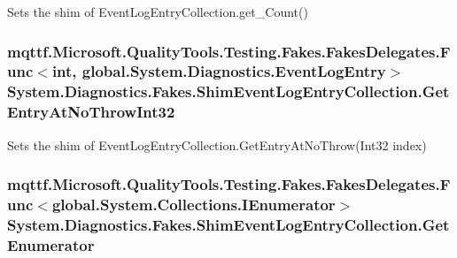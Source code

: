 Sets the shim of Event\-Log\-Entry\-Collection.\-get\-\_\-\-Count()

\hypertarget{class_system_1_1_diagnostics_1_1_fakes_1_1_shim_event_log_entry_collection_a3ee42a107182e3566f8a8c80ca0c7d21}{
\subsubsection[{Get\-Entry\-At\-No\-Throw\-Int32}]{\setlength{\rightskip}{0pt plus 5cm}mqttf.\-Microsoft.\-Quality\-Tools.\-Testing.\-Fakes.\-Fakes\-Delegates.\-Func$<$int, global.\-System.\-Diagnostics.\-Event\-Log\-Entry$>$ System.\-Diagnostics.\-Fakes.\-Shim\-Event\-Log\-Entry\-Collection.\-Get\-Entry\-At\-No\-Throw\-Int32\hspace{0.3cm}{\ttfamily [set]}}}\label{class_system_1_1_diagnostics_1_1_fakes_1_1_shim_event_log_entry_collection_a3ee42a107182e3566f8a8c80ca0c7d21}


Sets the shim of Event\-Log\-Entry\-Collection.\-Get\-Entry\-At\-No\-Throw(\-Int32 index)

\hypertarget{class_system_1_1_diagnostics_1_1_fakes_1_1_shim_event_log_entry_collection_ae9c7e3963a18166e4c06dfb8f2319dab}{
\subsubsection[{Get\-Enumerator}]{\setlength{\rightskip}{0pt plus 5cm}mqttf.\-Microsoft.\-Quality\-Tools.\-Testing.\-Fakes.\-Fakes\-Delegates.\-Func$<$global.\-System.\-Collections.\-I\-Enumerator$>$ System.\-Diagnostics.\-Fakes.\-Shim\-Event\-Log\-Entry\-Collection.\-Get\-Enumerator\hspace{0.3cm}{\ttfamily [set]}}}\label{class_system_1_1_diagnostics_1_1_fakes_1_1_shim_event_log_entry_collection_ae9c7e3963a18166e4c06dfb8f2319dab}


